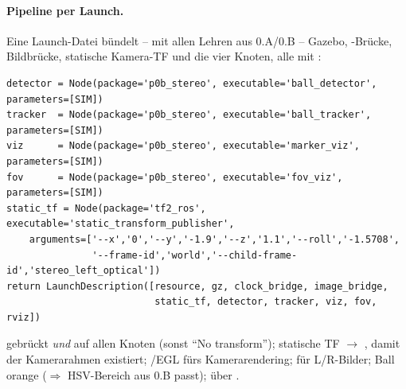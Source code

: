 \paragraph{Pipeline per Launch.} Eine Launch-Datei bündelt -- mit allen Lehren
aus 0.A/0.B -- Gazebo, -Brücke, Bildbrücke, statische Kamera-TF und
die vier Knoten, alle mit :
\begin{lstlisting}[style=py,caption={\code{launch/tabletennis.launch.py} (gekürzt)}]
detector = Node(package='p0b_stereo', executable='ball_detector', parameters=[SIM])
tracker  = Node(package='p0b_stereo', executable='ball_tracker',  parameters=[SIM])
viz      = Node(package='p0b_stereo', executable='marker_viz',    parameters=[SIM])
fov      = Node(package='p0b_stereo', executable='fov_viz',       parameters=[SIM])
static_tf = Node(package='tf2_ros', executable='static_transform_publisher',
    arguments=['--x','0','--y','-1.9','--z','1.1','--roll','-1.5708',
               '--frame-id','world','--child-frame-id','stereo_left_optical'])
return LaunchDescription([resource, gz, clock_bridge, image_bridge,
                          static_tf, detector, tracker, viz, fov, rviz])
\end{lstlisting}
\begin{infobox}[title={Checkliste 0.A/0.B -- in dieser Launch beachtet}]
 gebrückt \emph{und}  auf allen Knoten
(sonst ``No transform''); statische TF $\rightarrow$%
, damit der Kamerarahmen existiert; /EGL
fürs Kamerarendering;  für L/R-Bilder; Ball
orange ($\Rightarrow$ HSV-Bereich aus 0.B passt);  über
.
\end{infobox}

